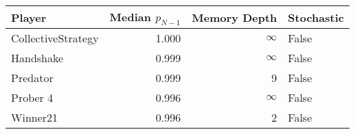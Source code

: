 \begin{tabular}{lrrl}
\toprule
             Player &  Median $p_{N-1}$ &  Memory Depth & Stochastic \\
\midrule
 CollectiveStrategy &             1.000 &            \(\infty\) &      False \\
          Handshake &             0.999 &            \(\infty\) &      False \\
           Predator &             0.999 &             9 &      False \\
           Prober 4 &             0.996 &            \(\infty\) &      False \\
           Winner21 &             0.996 &             2 &      False \\
\bottomrule
\end{tabular}
